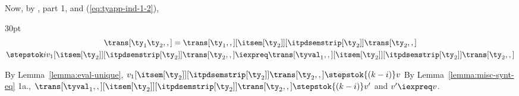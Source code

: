 \begin{list}{\textbf{Proof:}}{
      \setlength{\leftmargin}{0in}
      \setlength{\listparindent}{0in}}
\begin{caseproof}
Now, by , part 1, and (\ref{eq:tyapp-ind-1-2}),
\begin{setlength}{\multlinegap}{30pt}
  \begin{multline}
    \trans[{\ty_1} {\ty_2},,] 
    = \trans[{\ty_1},,]  [ \itsem[{\ty_2}] ] [ \itpdsemstrip[{\ty_2}] ] \trans[{\ty_2},,]\\
    \stepstok i {v_1} [ \itsem[{\ty_2}] ] [ \itpdsemstrip[{\ty_2}] ] \trans[{\ty_2},,]
    \iexpreq \trans[{\tyval_1},,] [ \itsem[{\ty_2}] ] [ \itpdsemstrip[{\ty_2}] ] \trans[{\ty_2},,]
  \end{multline}
\end{setlength}

By Lemma~\ref{lemma:eval-unique},
   ${v_1} [ \itsem[{\ty_2}] ] [ \itpdsemstrip[{\ty_2}] ]
   \trans[{\ty_2},,] \stepstok {(k-i)} v$
By Lemma~\ref{lemma:misc-synt-eq} 1a.,
  $\trans[{\tyval_1},,] [ \itsem[{\ty_2}] ] [ \itpdsemstrip[{\ty_2}] ]
  \trans[{\ty_2},,] \stepstok {(k-i)} v'$ and $v' \iexpreq v$.


\end{caseproof}
\end{list}
